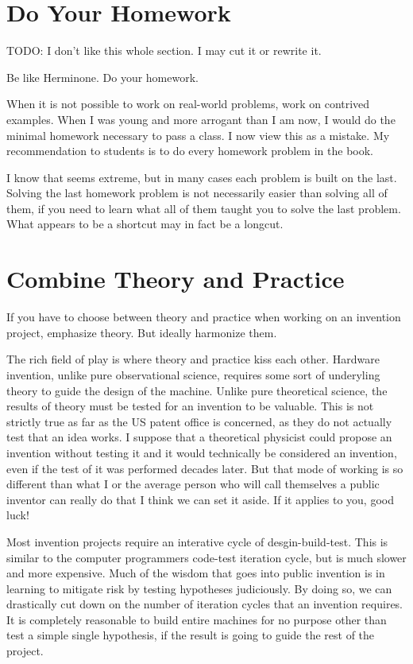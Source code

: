 \documentclass[
	fontsize=10pt, %
	twoside=false, %
	secnumdepth=1, %
]{kaobook}
\begin{document}
\section{Do Your Homework}

TODO: I don't like this whole section. I may cut it or rewrite it.

Be like Herminone. Do your homework.

When it is not possible to work on real-world problems, work on contrived examples.
When I was young and more arrogant than I am now, I would do the minimal homework
necessary to pass a class.
I now view this as a mistake.
My recommendation to students is to do every homework problem in the book.

I know that seems extreme, but in many cases each problem is built on the last.
Solving the last homework problem is not necessarily easier than solving all of them,
if you need to learn what all of them taught you to solve the last problem.
What appears to be a shortcut may in fact be a longcut.

\section{Combine Theory and Practice}

If you have to choose between theory and practice when
working on an invention project, emphasize theory.
But ideally harmonize them.

The rich field of play is where theory and practice
kiss each other.
Hardware invention, unlike pure observational science,
requires some sort of underyling theory to guide
the design of the machine.
Unlike pure theoretical science, the results
of theory must be tested for an invention to be valuable.
This is not strictly true as far as the US patent office
is concerned, as they do not actually test that an idea
works.
I suppose that a theoretical physicist could propose an
invention without testing it and it would technically be considered
an invention, even if the test of it was performed decades later.
But that mode of working is so different than what
I or the average person who will call themselves a public inventor
can really do that I think we can set it aside. If it applies
to you, good luck!

Most invention projects require an interative cycle of
desgin-build-test.
This is similar to the computer programmers code-test iteration
cycle, but is much slower and more expensive.
Much of the wisdom that goes into public invention is in
learning to mitigate risk by testing hypotheses judiciously.
By doing so, we can drastically cut down on the number of
iteration cycles that an invention requires.
It is completely reasonable to build entire machines
for no purpose other than test a simple single hypothesis, if
the result is going to guide the rest of the project.
\end{document}
